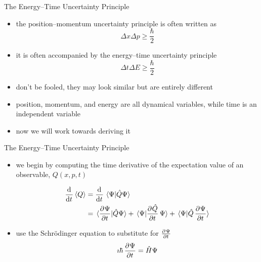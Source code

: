 \documentclass[ignorenonframetext,]{beamer}
\begin{document}
\begin{frame}{The Energy--Time Uncertainty Principle}

\begin{itemize}
\itemsep1pt\parskip0pt
\item
  the position--momentum uncertainty principle is often written as
  \[\Delta x \Delta p \geq \frac{\hbar}{2}\]
\item
  it is often accompanied by the energy--time uncertainty principle
  \[\Delta t \Delta E \geq \frac{\hbar}{2}\]
\item
  don't be fooled, they may look similar but are entirely different
\item
  position, momentum, and energy are all dynamical variables, while time
  is an independent variable
\item
  now we will work towards deriving it
\end{itemize}

\end{frame}

\begin{frame}{The Energy--Time Uncertainty Principle}

\begin{itemize}
\itemsep1pt\parskip0pt
\item
  we begin by computing the time derivative of the expectation value of
  an observable, \(Q(x, p, t)\)

  \begin{align*}
  \dod{}{t} \expval{Q} &=
  \dod{}{t} \braket*{\Psi}{\hat{Q} \Psi}
  \\ &=
  \braket*{\dpd{\Psi}{t}}{\hat{Q} \Psi} +
  \braket*{\Psi}{\dpd{\hat{Q}}{t} \Psi} +
  \braket*{\Psi}{\hat{Q} \dpd{\Psi}{t}}
  \end{align*}
\item
  use the Schrödinger equation to substitute for \(\pd{\Psi}{t}\)
  \[\imath\hbar \dpd{\Psi}{t} = \hat{H} \Psi\]
\end{itemize}

\end{frame}
\end{document}
